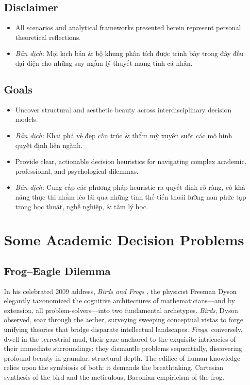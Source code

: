 \documentclass{article}
\begin{document}
\subsection{Disclaimer}
\begin{itemize}
	\item All scenarios and analytical frameworks presented herein represent personal theoretical reflections.
	
	\item \textit{Bản dịch:} Mọi kịch bản \& bộ khung phân tích được trình bày trong đây đều đại diện cho những suy ngẫm lý thuyết mang tính cá nhân.
\end{itemize}

\subsection{Goals}
\begin{itemize}
	\item Uncover structural and aesthetic beauty across interdisciplinary decision models.
	
	\item \textit{Bản dịch:} Khai phá vẻ đẹp cấu trúc \& thẩm mỹ xuyên suốt các mô hình quyết định liên ngành.
	
	\item Provide clear, actionable decision heuristics for navigating complex academic, professional, and psychological dilemmas.
	
	\item \textit{Bản dịch:} Cung cấp các phương pháp heuristic ra quyết định rõ ràng, có khả năng thực thi nhằm lèo lái qua những tình thế tiến thoái lưỡng nan phức tạp trong học thuật, nghề nghiệp, \& tâm lý học.
\end{itemize}

\section{Some Academic Decision Problems}

\subsection{Frog--Eagle Dilemma}

In his celebrated 2009 address, \textit{Birds and Frogs} \cite{dyson2009birds}, the physicist Freeman Dyson elegantly taxonomized the cognitive architectures of mathematicians---and by extension, all problem-solvers---into two fundamental archetypes. \textit{Birds}, Dyson observed, soar through the aether, surveying sweeping conceptual vistas to forge unifying theories that bridge disparate intellectual landscapes. \textit{Frogs}, conversely, dwell in the terrestrial mud, their gaze anchored to the exquisite intricacies of their immediate surroundings; they dismantle problems sequentially, discovering profound beauty in granular, structural depth. The edifice of human knowledge relies upon the symbiosis of both: it demands the breathtaking, Cartesian synthesis of the bird and the meticulous, Baconian empiricism of the frog.
\end{document}
